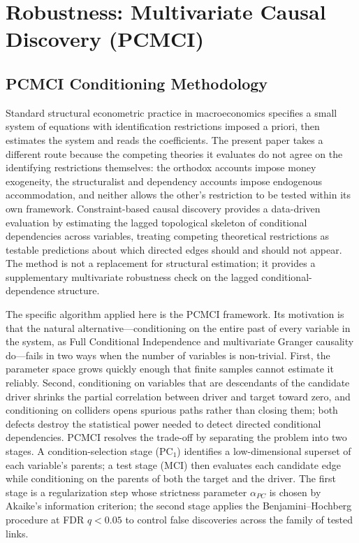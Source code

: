 \section{Robustness: Multivariate Causal Discovery (PCMCI)}
\label{app:pcmci_ee1}
\label{app:causal_pcmci_ee1}

\subsection{PCMCI Conditioning Methodology}
Standard structural econometric practice in macroeconomics specifies a small system of equations with identification restrictions imposed a priori, then estimates the system and reads the coefficients. The present paper takes a different route because the competing theories it evaluates do not agree on the identifying restrictions themselves: the orthodox accounts impose money exogeneity, the structuralist and dependency accounts impose endogenous accommodation, and neither allows the other's restriction to be tested within its own framework. Constraint-based causal discovery provides a data-driven evaluation by estimating the lagged topological skeleton of conditional dependencies across variables, treating competing theoretical restrictions as testable predictions about which directed edges should and should not appear. The method is not a replacement for structural estimation; it provides a supplementary multivariate robustness check on the lagged conditional-dependence structure.

The specific algorithm applied here is the \citet{Runge2019} PCMCI framework. Its motivation is that the natural alternative---conditioning on the entire past of every variable in the system, as Full Conditional Independence and multivariate Granger causality do---fails in two ways when the number of variables is non-trivial. First, the parameter space grows quickly enough that finite samples cannot estimate it reliably. Second, conditioning on variables that are descendants of the candidate driver shrinks the partial correlation between driver and target toward zero, and conditioning on colliders opens spurious paths rather than closing them; both defects destroy the statistical power needed to detect directed conditional dependencies. PCMCI resolves the trade-off by separating the problem into two stages. A condition-selection stage (PC$_1$) identifies a low-dimensional superset of each variable's parents; a test stage (MCI) then evaluates each candidate edge while conditioning on the parents of both the target and the driver. The first stage is a regularization step whose strictness parameter $\alpha_{PC}$ is chosen by Akaike's information criterion; the second stage applies the Benjamini--Hochberg procedure at FDR $q < 0.05$ to control false discoveries across the family of tested links.

